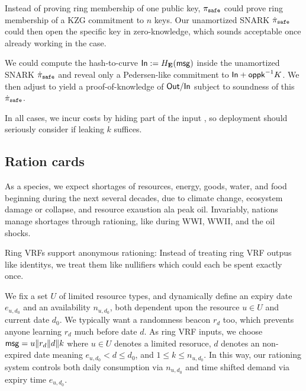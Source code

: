 Instead of proving ring membership of one public key,
$\pi_{\mathtt{safe}}$ could prove ring membership of a KZG commitment to $n$ keys.
Our unamortized SNARK $\dot{\pi}_{\mathtt{safe}}$ could then open the specific key in
zero-knowledge, which sounds acceptable once already working in the \pisafe case.

We could compute the hash-to-curve ${\mathsf{In}} := H_{{\mathbf{E}}}(\mathsf{msg})$ inside the
unamortized SNARK $\dot{\pi}_{\mathtt{safe}}$ and reveal only a Pedersen-like commitment
to ${\mathsf{In}} + \mathsf{oppk}^{-1} K$.  We then adjust \PedVRF to yield
a proof-of-knowledge of ${\mathsf{Out}}/{\mathsf{In}}$ subject to soundness of this
$\dot{\pi}_{\mathtt{safe}}$.

In all cases, we incur costs by hiding part of the input \msg, so
deployment should seriously consider if leaking $k$ suffices.



\subsection{Ration cards}

As a species, we expect shortages of resources, energy, goods, water,
and food beginning during the next several decades, due to climate change,
ecosystem damage or collapse, and resource exaustion ala peak oil. 
Invariably, nations manage shortages through rationing, like during
WWI, WWII, and the oil shocks.  

Ring VRFs support anonymous rationing:
Instead of treating ring VRF outpus like identitys,
we treat them like nullifiers which could each be spent exactly once.

\def\expiry{e}
We fix a set $U$ of limited resource types, and dynamically define
an expiry date $\expiry_{u,d_0}$ and an availability $n_{u,d_0}$, 
both dependent upon the resource $u \in U$ and current date $d_0$.
We typically want a randomness beacon $r_d$ too, which prevents
anyone learning $r_d$ much before date $d$. 
As ring VRF inputs, we choose
 $\mathsf{msg} = u \| r_d \| d \| k$
where $u \in U$ denotes a limited resoruce,
 $d$ denotes an non-expired date meaning $\expiry_{u,d_0} < d \le d_0$,
 and $1 \le k \le n_{u,d_0}$.
In this way, our rationing system controls both daily consumption
via $n_{u,d_0}$ and time shifted demand via expiry time $\expiry_{u,d_0}$.

